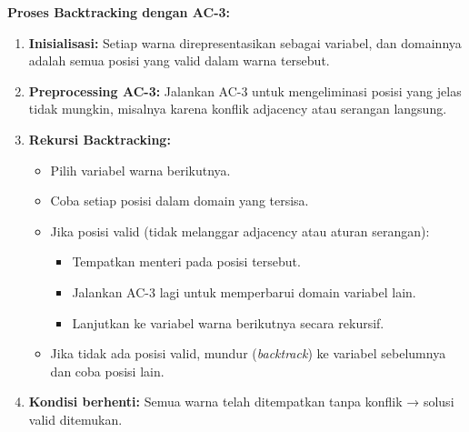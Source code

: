 \documentclass[a4paper,twoside]{article}
\begin{document}
\begin{enumerate}
	\textbf{Proses Backtracking dengan AC-3:}
	\begin{enumerate}
		\item \textbf{Inisialisasi:} Setiap warna direpresentasikan sebagai variabel, dan domainnya adalah semua posisi yang valid dalam warna tersebut.
		\item \textbf{Preprocessing AC-3:} Jalankan AC-3 untuk mengeliminasi posisi yang jelas tidak mungkin, misalnya karena konflik adjacency atau serangan langsung.
		\item \textbf{Rekursi Backtracking:} 
		\begin{itemize}
			\item Pilih variabel warna berikutnya.
			\item Coba setiap posisi dalam domain yang tersisa.
			\item Jika posisi valid (tidak melanggar adjacency atau aturan serangan):
			\begin{itemize}
				\item Tempatkan menteri pada posisi tersebut.
				\item Jalankan AC-3 lagi untuk memperbarui domain variabel lain.
				\item Lanjutkan ke variabel warna berikutnya secara rekursif.
			\end{itemize}
			\item Jika tidak ada posisi valid, mundur (\textit{backtrack}) ke variabel sebelumnya dan coba posisi lain.
		\end{itemize}
		\item \textbf{Kondisi berhenti:} Semua warna telah ditempatkan tanpa konflik → solusi valid ditemukan.
	\end{enumerate}
	

\end{enumerate}
\end{document}
